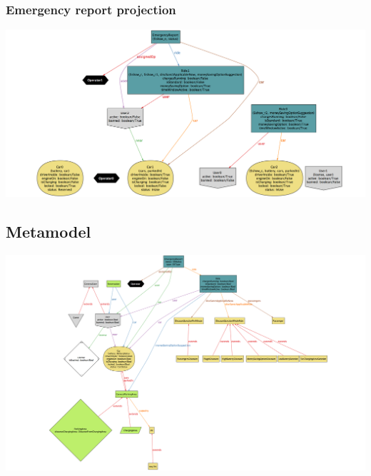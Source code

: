 \begin{landscape}
		\subsubsection{Emergency report projection}
			\includegraphics[width=2\textwidth, center]{img/emergency_reports.png}
	\end{landscape}
	
	\begin{landscape}
	\subsection{Metamodel}
		\includegraphics[width=1.5\textwidth, center]{img/metamodel.png}
	\end{landscape}